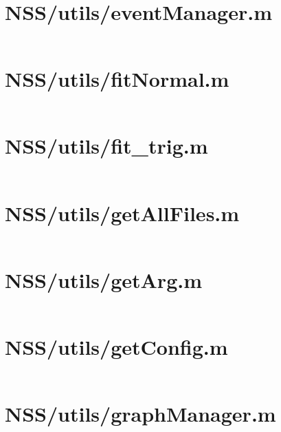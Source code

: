 \pagebreak
\section*{NSS/utils/eventManager.m}\label{code:NSS/utils/eventManager.m}
\inputminted[linenos,fontsize=\scriptsize]{matlab}{/home/dcouture/git/mathyourlife/TSatPy/beta_versions/matlab_object_oriented/utils/eventManager.m}

\pagebreak
\section*{NSS/utils/fitNormal.m}\label{code:NSS/utils/fitNormal.m}
\inputminted[linenos,fontsize=\scriptsize]{matlab}{/home/dcouture/git/mathyourlife/TSatPy/beta_versions/matlab_object_oriented/utils/fitNormal.m}

\pagebreak
\section*{NSS/utils/fit\_trig.m}\label{code:NSS/utils/fit_trig.m}
\inputminted[linenos,fontsize=\scriptsize]{matlab}{/home/dcouture/git/mathyourlife/TSatPy/beta_versions/matlab_object_oriented/utils/fit_trig.m}

\pagebreak
\section*{NSS/utils/getAllFiles.m}\label{code:NSS/utils/getAllFiles.m}
\inputminted[linenos,fontsize=\scriptsize]{matlab}{/home/dcouture/git/mathyourlife/TSatPy/beta_versions/matlab_object_oriented/utils/getAllFiles.m}

\pagebreak
\section*{NSS/utils/getArg.m}\label{code:NSS/utils/getArg.m}
\inputminted[linenos,fontsize=\scriptsize]{matlab}{/home/dcouture/git/mathyourlife/TSatPy/beta_versions/matlab_object_oriented/utils/getArg.m}

\pagebreak
\section*{NSS/utils/getConfig.m}\label{code:NSS/utils/getConfig.m}
\inputminted[linenos,fontsize=\scriptsize]{matlab}{/home/dcouture/git/mathyourlife/TSatPy/beta_versions/matlab_object_oriented/utils/getConfig.m}

\pagebreak
\section*{NSS/utils/graphManager.m}\label{code:NSS/utils/graphManager.m}
\inputminted[linenos,fontsize=\scriptsize]{matlab}{/home/dcouture/git/mathyourlife/TSatPy/beta_versions/matlab_object_oriented/utils/graphManager.m}

